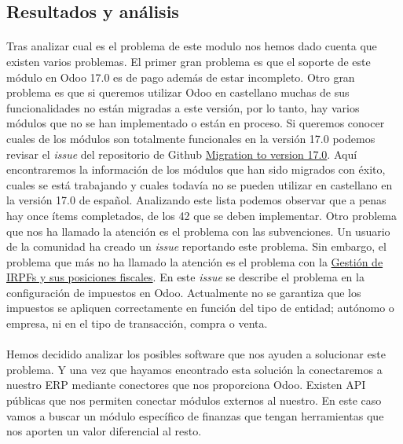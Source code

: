 \subsection{Resultados y análisis}
\paragraph{}
Tras analizar cual es el problema de este modulo nos hemos dado cuenta que existen varios problemas. El primer gran problema es que el soporte de este módulo en Odoo 17.0 es de pago además de estar incompleto. Otro gran problema es que si queremos utilizar Odoo en castellano muchas de sus funcionalidades no están migradas a este versión, por lo tanto, hay varios módulos que no se han implementado o están en proceso. Si queremos conocer cuales de los módulos son totalmente funcionales en la versión 17.0 podemos revisar el \textit{issue} del repositorio de Github \href{https://github.com/OCA/l10n-spain/issues/3298}{Migration to version 17.0}. Aquí encontraremos la información de los módulos que han sido migrados con éxito, cuales se está trabajando y cuales todavía no se pueden utilizar en castellano en la versión 17.0 de español. Analizando este lista podemos observar que a penas hay once ítems completados, de los 42 que se deben implementar. Otro problema que nos ha llamado la atención es el problema con las subvenciones. Un usuario de la comunidad ha creado un \textit{issue} reportando este problema. Sin embargo, el problema que más no ha llamado la atención es el problema con la \href{https://github.com/OCA/l10n-spain/issues/3527}{Gestión de IRPFs y sus posiciones fiscales}. En este \textit{issue} se describe el problema en la configuración de impuestos en Odoo. Actualmente no se garantiza que los impuestos se apliquen correctamente en función del tipo de entidad; autónomo o empresa, ni en el tipo de transacción, compra o venta.

\paragraph{}
Hemos decidido analizar los posibles software que nos ayuden a solucionar este problema. Y una vez que hayamos encontrado esta solución la conectaremos a nuestro ERP mediante conectores que nos proporciona Odoo. Existen API públicas que nos permiten conectar módulos externos al nuestro. En este caso vamos a buscar un módulo específico de finanzas que tengan herramientas que nos aporten un valor diferencial al resto. 

